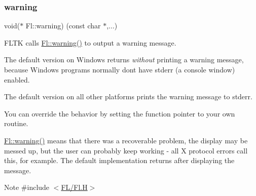 \subsubsection{\texorpdfstring{warning}{warning}}
{\footnotesize\ttfamily void($\ast$ Fl\+::warning) (const char $\ast$,...)\hspace{0.3cm}{\ttfamily [static]}}

F\+L\+TK calls \hyperlink{group__group__comdlg_ga915dadc35b73240c89b463a94c1e7d11}{Fl\+::warning()} to output a warning message.

The default version on Windows returns {\itshape without} printing a warning message, because Windows programs normally don\textquotesingle{}t have stderr (a console window) enabled.

The default version on all other platforms prints the warning message to stderr.

You can override the behavior by setting the function pointer to your own routine.

\hyperlink{group__group__comdlg_ga915dadc35b73240c89b463a94c1e7d11}{Fl\+::warning()} means that there was a recoverable problem, the display may be messed up, but the user can probably keep working -\/ all X protocol errors call this, for example. The default implementation returns after displaying the message. \begin{DoxyNote}{Note}
\#include $<$\hyperlink{_fl_8_h}{F\+L/\+Fl.\+H}$>$ 
\end{DoxyNote}
